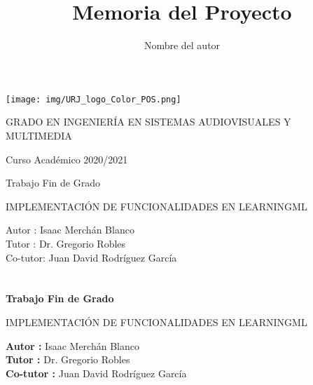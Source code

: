 \documentclass[a4paper, 12pt]{book}
\title{Memoria del Proyecto}
\author{Nombre del autor}
\begin{document}
\renewcommand{\refname}{Bibliografía}  %
\renewcommand{\appendixname}{Apéndice}


\begin{titlepage}
\begin{center}
\texttt{[image: img/URJ\_logo\_Color\_POS.png]}

\vspace{1.75cm}

\Large
GRADO EN INGENIERÍA EN SISTEMAS AUDIOVISUALES Y MULTIMEDIA

\vspace{0.4cm}

\large
Curso Académico 2020/2021

\vspace{0.8cm}

Trabajo Fin de Grado

\vspace{2.5cm}

\LARGE
IMPLEMENTACIÓN DE FUNCIONALIDADES EN LEARNINGML

\vspace{4cm}

\large
Autor : Isaac Merchán Blanco\\
Tutor : Dr. Gregorio Robles\\
Co-tutor: Juan David Rodríguez García
\end{center}
\end{titlepage}

\newpage
\mbox{}
\thispagestyle{empty} %


\clearpage
{}
\chapter*{}

\vspace{-4cm}
\begin{center}
\LARGE
\textbf{Trabajo Fin de Grado}

\vspace{1cm}
\large
IMPLEMENTACIÓN DE FUNCIONALIDADES EN LEARNINGML

\vspace{1cm}
\large
\textbf{Autor :} Isaac Merchán Blanco \\
\textbf{Tutor :} Dr. Gregorio Robles \\
\textbf{Co-tutor :} Juan David Rodríguez García

\end{center}
\end{document}
